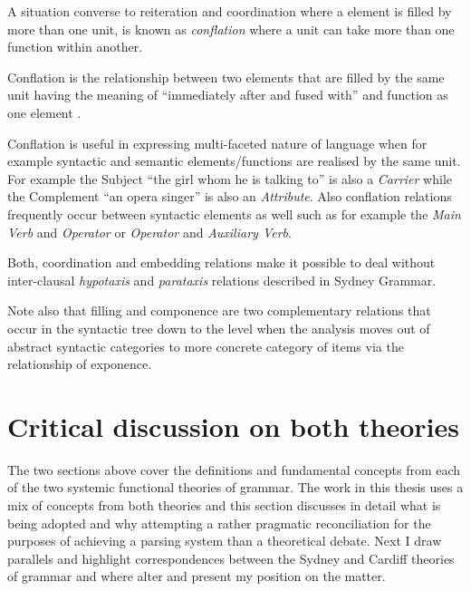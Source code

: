 A situation converse to reiteration and coordination where a element is filled by more than one unit, is known as \textit{conflation} where a unit can take more than one function within another. 

\begin{definition}[Conflation]\label{def:conflation}
    Conflation is the relationship between two elements that are filled by the same unit having the meaning of ``immediately after and fused with'' and function as one element \citep[249--250]{Fawcett2000}. 
\end{definition}

Conflation is useful in expressing multi-faceted nature of language when for example syntactic and semantic elements/functions are realised by the same unit. For example the Subject ``the girl whom he is talking to'' is also a \textit{Carrier} while the Complement ``an opera singer'' is also an \textit{Attribute}. Also conflation relations frequently occur between syntactic elements as well such as for example the \textit{Main Verb} and \textit{Operator} or \textit{Operator} and \textit{Auxiliary Verb}.

Both, coordination and embedding relations make it possible to deal without inter-clausal \textit{hypotaxis} and \textit{parataxis} relations described in Sydney Grammar.

%
Note also that filling and componence are two complementary relations that occur in the syntactic tree down to the level when the analysis moves out of abstract syntactic categories to more concrete category of items via the relationship of exponence.

\section{Critical discussion on both theories}

The two sections above cover the definitions and fundamental concepts from each of the two systemic functional theories of grammar. The work in this thesis uses a mix of concepts from both theories and this section discusses in detail what is being adopted and why attempting a rather pragmatic reconciliation for the purposes of achieving a parsing system than a theoretical debate. Next I draw parallels and highlight correspondences between the Sydney and Cardiff theories of grammar and where alter and present my position on the matter. 

